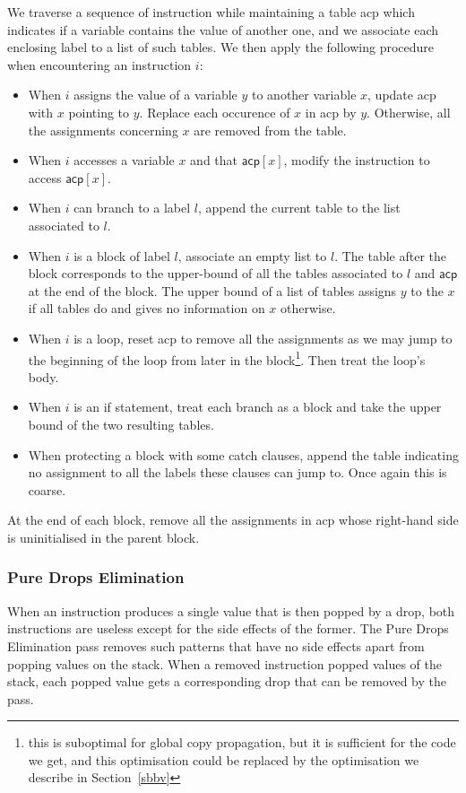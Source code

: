\documentclass[a4paper,11pt]{article}
\begin{document}
We traverse a sequence of instruction while maintaining a table \textsf{acp}
which indicates if a variable contains the value of another one, and we
associate each enclosing label to a list of such tables. We then apply the
following procedure when encountering an instruction $i$:
\begin{itemize}\setlength{\itemsep}{0pt}
  \item When $i$ assigns the value of a variable $y$ to another
    variable $x$, update \textsf{acp} with $x$ pointing to $y$. Replace each
    occurence of $x$ in \textsf{acp} by $y$. Otherwise, all the assignments
    concerning $x$ are removed from the table.
  \item When $i$ accesses a variable $x$ and that $\textsf{acp}[x]$,
    modify the instruction to access $\textsf{acp}[x]$.
  \item When $i$ can branch to a label $l$, append the current table to
    the list associated to $l$.
  \item When $i$ is a block of label $l$, associate an empty list to $l$. The
    table after the block corresponds to the upper-bound of all the tables
    associated to $l$ and $\textsf{acp}$ at the end of the block. The upper
    bound of a list of tables assigns $y$ to the $x$ if all tables do and gives
    no information on $x$ otherwise.
  \item When $i$ is a loop, reset \textsf{acp} to remove all the assignments as
    we may jump to the beginning of the loop from later in the
    block\footnote{this is suboptimal for global copy propagation, but it is
    sufficient for the code we get, and this optimisation could be replaced by
    the optimisation we describe in Section~\ref{sbbv}}. Then treat the loop's
    body.
  \item When $i$ is an if statement, treat each branch as a block and
    take the upper bound of the two resulting tables.
  \item When protecting a block with some \textsf{catch} clauses, append
    the table indicating no assignment to all the labels these clauses can jump
    to. Once again this is coarse.
\end{itemize}

At the end of each block, remove all the assignments in \textsf{acp} whose
right-hand side is uninitialised in the parent block.
\subsubsection{Pure Drops Elimination}
When an instruction produces a single value that is then popped by a
\textsf{drop}, both instructions are useless except for the side effects of the
former. The Pure Drops Elimination pass removes such patterns that have no side
effects apart from popping values on the stack. When a removed instruction
popped values of the stack, each popped value gets a corresponding \textsf{drop}
that can be removed by the pass.
\end{document}
